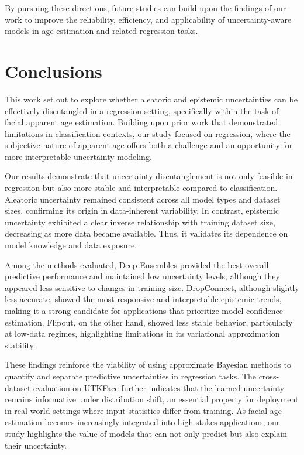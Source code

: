 \documentclass[runningheads]{llncs}
\begin{document}
By pursuing these directions, future studies can build upon the findings of our work to improve the reliability, efficiency, and applicability of uncertainty-aware models in age estimation and related regression tasks.

\section{Conclusions}
\label{sec:conclusion}

This work set out to explore whether aleatoric and epistemic uncertainties can be effectively disentangled in a regression setting, specifically within the task of facial apparent age estimation. Building upon prior work that demonstrated limitations in classification contexts, our study focused on regression, where the subjective nature of apparent age offers both a challenge and an opportunity for more interpretable uncertainty modeling.

Our results demonstrate that uncertainty disentanglement is not only feasible in regression but also more stable and interpretable compared to classification. Aleatoric uncertainty remained consistent across all model types and dataset sizes, confirming its origin in data-inherent variability. In contrast, epistemic uncertainty exhibited a clear inverse relationship with training dataset size, decreasing as more data became available. Thus, it validates its dependence on model knowledge and data exposure.

Among the methods evaluated, Deep Ensembles provided the best overall predictive performance and maintained low uncertainty levels, although they appeared less sensitive to changes in training size. DropConnect, although slightly less accurate, showed the most responsive and interpretable epistemic trends, making it a strong candidate for applications that prioritize model confidence estimation. Flipout, on the other hand, showed less stable behavior, particularly at low-data regimes, highlighting limitations in its variational approximation stability.

These findings reinforce the viability of using approximate Bayesian methods to quantify and separate predictive uncertainties in regression tasks. The cross-dataset evaluation on UTKFace further indicates that the learned uncertainty remains informative under distribution shift, an essential property for deployment in real-world settings where input statistics differ from training. As facial age estimation becomes increasingly integrated into high-stakes applications, our study highlights the value of models that can not only predict but also explain their uncertainty.
\end{document}
